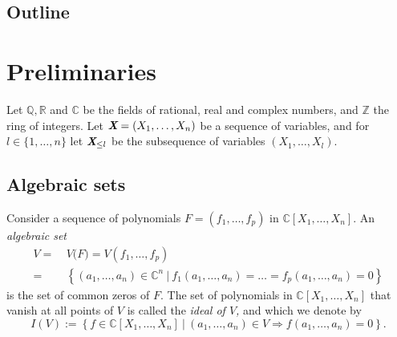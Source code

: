 \documentclass[a4paper]{article}
\def\Xb{\textit{\textbf{X}}}
\newcommand{\ZZ}{{\mathbb{Z}}}
\def\C{\mathbb{C}}
\def\Q{\mathbb{Q}}
\def\R{\mathbb{R}}
\begin{document}
\subsection{Outline}



















\section{Preliminaries}
Let $\Q, \R$ and $\C$ be the fields of rational, real and complex numbers, and $\ZZ$ the ring of integers. Let $\Xb = (X_1, \hdots , X_n)$ be a sequence of variables, and for $l \in \{1,\hdots,n\}$ let $\Xb_{\leq l}$ be the subsequence of variables $(X_1, \hdots , X_l)$.



\subsection{Algebraic sets} 
Consider a sequence of polynomials $F=(f_1,\hdots,f_p)$ in $\C[X_1,\hdots,X_n].$
An \textit{algebraic set} 
\begin{align*}
V = ~&V\big(F) = V(f_1,\hdots,f_p) \\
= ~&\left\{(a_1,\hdots,a_n) \in \C^n~|~f_1(a_1,\hdots,a_n)=\hdots=f_p(a_1,\hdots,a_n)=0\right\}
\end{align*}
is the set of common zeros of $F$.  The set of polynomials in $\C[X_1,\hdots, X_n]$ that vanish at all points of $V$ is called the \textit{ideal of $V$,} and which we denote by 
\[
I(V) := \left\{f \in \C[X_1,\hdots,X_n]~|~(a_1,\hdots,a_n) \in V \Rightarrow f(a_1,\hdots,a_n)=0\right\}. 
\]




\end{document}
